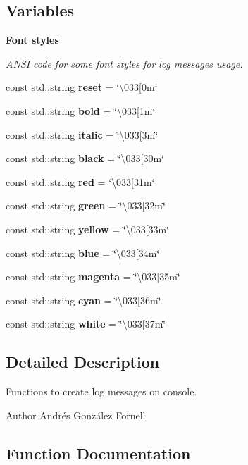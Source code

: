 \subsection*{Variables}
\begin{Indent}\textbf{ Font styles}\par
{\em A\+N\+SI code for some font styles for log messages usage. }\begin{DoxyCompactItemize}
\item 
const std\+::string \textbf{ reset} = \char`\"{}\textbackslash{}033[0m\char`\"{}
\item 
const std\+::string \textbf{ bold} = \char`\"{}\textbackslash{}033[1m\char`\"{}
\item 
const std\+::string \textbf{ italic} = \char`\"{}\textbackslash{}033[3m\char`\"{}
\item 
const std\+::string \textbf{ black} = \char`\"{}\textbackslash{}033[30m\char`\"{}
\item 
const std\+::string \textbf{ red} = \char`\"{}\textbackslash{}033[31m\char`\"{}
\item 
const std\+::string \textbf{ green} = \char`\"{}\textbackslash{}033[32m\char`\"{}
\item 
const std\+::string \textbf{ yellow} = \char`\"{}\textbackslash{}033[33m\char`\"{}
\item 
const std\+::string \textbf{ blue} = \char`\"{}\textbackslash{}033[34m\char`\"{}
\item 
const std\+::string \textbf{ magenta} = \char`\"{}\textbackslash{}033[35m\char`\"{}
\item 
const std\+::string \textbf{ cyan} = \char`\"{}\textbackslash{}033[36m\char`\"{}
\item 
const std\+::string \textbf{ white} = \char`\"{}\textbackslash{}033[37m\char`\"{}
\end{DoxyCompactItemize}
\end{Indent}


\subsection{Detailed Description}
Functions to create log messages on console. 

\begin{DoxyAuthor}{Author}
Andrés González Fornell 
\end{DoxyAuthor}


\subsection{Function Documentation}
\mbox{\label{_logger_8cpp_ad3268f5fc285cfb356a498e2d24b27f4}} 

